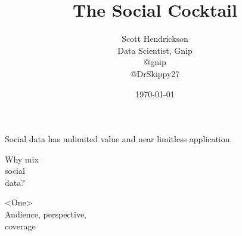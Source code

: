 \documentclass{beamer}
\begin{document}
\title{The Social Cocktail}  
\author{Scott Hendrickson \\ Data Scientist, Gnip\\ [10pt] @gnip \\ @DrSkippy27}
\date{\today} 


\begin{frame}
\titlepage
\end{frame}




\begin{frame}
\begin{center}
\Huge Social data has unlimited value and near limitless application
\end{center}
\end{frame}

%


\begin{frame}
\begin{center}
{\Huge Why mix \\ [5pt] social  \\ [15pt] data? }
\end{center}
\end{frame}


\begin{frame}
\begin{center}
{\Huge <One> \\ [5pt]  Audience, perspective, \\  [15pt] coverage }
\end{center}
\end{frame}
\end{document}
